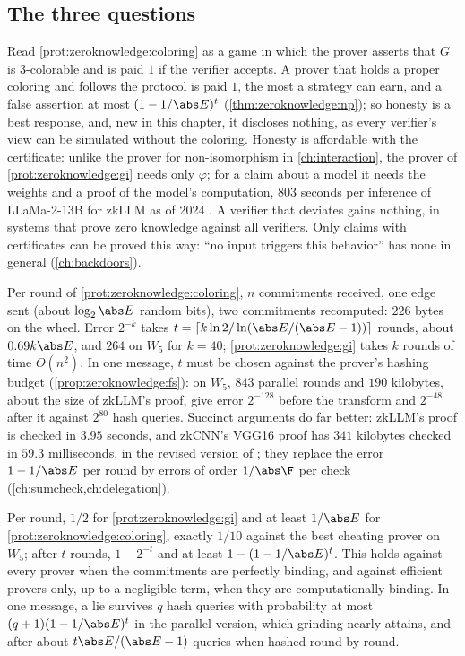 \begin{refsection}
\section{The three questions}\label{sec:zeroknowledge:questions}

\questionone Read \cref{prot:zeroknowledge:coloring} as a game in which the prover asserts that $G$ is 3-colorable and is paid $1$ if the verifier accepts. A prover that holds a proper coloring and follows the protocol is paid $1$, the most a strategy can earn, and a false assertion at most $(1-1/\abs E)^t$ (\cref{thm:zeroknowledge:np}); so honesty is a best response, and, new in this chapter, it discloses nothing, as every verifier's view can be simulated without the coloring. Honesty is affordable with the certificate: unlike the prover for non-isomorphism in \cref{ch:interaction}, the prover of \cref{prot:zeroknowledge:gi} needs only $\varphi$; for a claim about a model it needs the weights and a proof of the model's computation, $803$ seconds per inference of LLaMa-2-13B for zkLLM as of 2024 \parencite{SunLiZhang2024}. A verifier that deviates gains nothing, in systems that prove zero knowledge against all verifiers. Only claims with certificates can be proved this way: ``no input triggers this behavior'' has none in general (\cref{ch:backdoors}).

\questiontwo Per round of \cref{prot:zeroknowledge:coloring}, $n$ commitments received, one edge sent (about $\log_2\abs E$ random bits), two commitments recomputed: $226$ bytes on the wheel. Error $2^{-k}$ takes $t=\lceil k\ln2/\ln(\abs E/(\abs E-1))\rceil$ rounds, about $0.69k\abs E$, and $264$ on $W_5$ for $k=40$; \cref{prot:zeroknowledge:gi} takes $k$ rounds of time $O(n^2)$. In one message, $t$ must be chosen against the prover's hashing budget (\cref{prop:zeroknowledge:fs}): on $W_5$, $843$ parallel rounds and $190$ kilobytes, about the size of zkLLM's proof, give error $2^{-128}$ before the transform and $2^{-48}$ after it against $2^{80}$ hash queries. Succinct arguments do far better: zkLLM's proof is checked in $3.95$ seconds, and zkCNN's VGG16 proof has $341$ kilobytes checked in $59.3$ milliseconds, in the revised version of \textcite{LiuXieZhang2021}; they replace the error $1-1/\abs E$ per round by errors of order $1/\abs\F$ per check (\cref{ch:sumcheck,ch:delegation}).

\questionthree Per round, $1/2$ for \cref{prot:zeroknowledge:gi} and at least $1/\abs E$ for \cref{prot:zeroknowledge:coloring}, exactly $1/10$ against the best cheating prover on $W_5$; after $t$ rounds, $1-2^{-t}$ and at least $1-(1-1/\abs E)^t$. This holds against every prover when the commitments are perfectly binding, and against efficient provers only, up to a negligible term, when they are computationally binding. In one message, a lie survives $q$ hash queries with probability at most $(q+1)(1-1/\abs E)^t$ in the parallel version, which grinding nearly attains, and after about $t\abs E/(\abs E-1)$ queries when hashed round by round.


\end{refsection}
